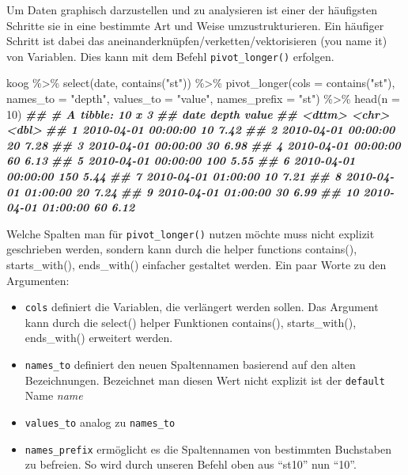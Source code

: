 \documentclass[
]{article}
\newenvironment{Shaded}{\begin{snugshade}}{\end{snugshade}}
\newcommand{\AttributeTok}[1]{\textcolor[rgb]{0.77,0.63,0.00}{#1}}
\newcommand{\DecValTok}[1]{\textcolor[rgb]{0.00,0.00,0.81}{#1}}
\newcommand{\DocumentationTok}[1]{\textcolor[rgb]{0.56,0.35,0.01}{\textbf{\textit{#1}}}}
\newcommand{\FunctionTok}[1]{\textcolor[rgb]{0.00,0.00,0.00}{#1}}
\newcommand{\NormalTok}[1]{#1}
\newcommand{\SpecialCharTok}[1]{\textcolor[rgb]{0.00,0.00,0.00}{#1}}
\newcommand{\StringTok}[1]{\textcolor[rgb]{0.31,0.60,0.02}{#1}}
\providecommand{\tightlist}{%
  \setlength{\itemsep}{0pt}\setlength{\parskip}{0pt}}
\begin{document}
Um Daten graphisch darzustellen und zu analysieren ist einer der häufigsten Schritte sie in eine bestimmte Art und Weise umzustrukturieren. Ein häufiger Schritt ist dabei das aneinanderknüpfen/verketten/vektorisieren (you name it) von Variablen. Dies kann mit dem Befehl \texttt{pivot\_longer()} erfolgen.

\begin{Shaded}
\begin{Highlighting}[]
\NormalTok{koog }\SpecialCharTok{\%\textgreater{}\%}
  \FunctionTok{select}\NormalTok{(date, }\FunctionTok{contains}\NormalTok{(}\StringTok{"st"}\NormalTok{)) }\SpecialCharTok{\%\textgreater{}\%}
  \FunctionTok{pivot\_longer}\NormalTok{(}\AttributeTok{cols =} \FunctionTok{contains}\NormalTok{(}\StringTok{"st"}\NormalTok{), }\AttributeTok{names\_to =} \StringTok{"depth"}\NormalTok{, }\AttributeTok{values\_to =} \StringTok{"value"}\NormalTok{, }\AttributeTok{names\_prefix =} \StringTok{"st"}\NormalTok{) }\SpecialCharTok{\%\textgreater{}\%}
  \FunctionTok{head}\NormalTok{(}\AttributeTok{n =} \DecValTok{10}\NormalTok{)}
\DocumentationTok{\#\# \# A tibble: 10 x 3}
\DocumentationTok{\#\#    date                depth value}
\DocumentationTok{\#\#    \textless{}dttm\textgreater{}              \textless{}chr\textgreater{} \textless{}dbl\textgreater{}}
\DocumentationTok{\#\#  1 2010{-}04{-}01 00:00:00 10     7.42}
\DocumentationTok{\#\#  2 2010{-}04{-}01 00:00:00 20     7.28}
\DocumentationTok{\#\#  3 2010{-}04{-}01 00:00:00 30     6.98}
\DocumentationTok{\#\#  4 2010{-}04{-}01 00:00:00 60     6.13}
\DocumentationTok{\#\#  5 2010{-}04{-}01 00:00:00 100    5.55}
\DocumentationTok{\#\#  6 2010{-}04{-}01 00:00:00 150    5.44}
\DocumentationTok{\#\#  7 2010{-}04{-}01 01:00:00 10     7.21}
\DocumentationTok{\#\#  8 2010{-}04{-}01 01:00:00 20     7.24}
\DocumentationTok{\#\#  9 2010{-}04{-}01 01:00:00 30     6.99}
\DocumentationTok{\#\# 10 2010{-}04{-}01 01:00:00 60     6.12}
\end{Highlighting}
\end{Shaded}

Welche Spalten man für \texttt{pivot\_longer()} nutzen möchte muss nicht explizit geschrieben werden, sondern kann durch die helper functions contains(), starts\_with(), ends\_with() einfacher gestaltet werden. Ein paar Worte zu den Argumenten:

\begin{itemize}
\tightlist
\item
  \texttt{cols} definiert die Variablen, die verlängert werden sollen. Das Argument kann durch die select() helper Funktionen contains(), starts\_with(), ends\_with() erweitert werden.
\item
  \texttt{names\_to} definiert den neuen Spaltennamen basierend auf den alten Bezeichnungen. Bezeichnet man diesen Wert nicht explizit ist der \texttt{default} Name \emph{name}
\item
  \texttt{values\_to} analog zu \texttt{names\_to}
\item
  \texttt{names\_prefix} ermöglicht es die Spaltennamen von bestimmten Buchstaben zu befreien. So wird durch unseren Befehl oben aus ``st10'' nun ``10''.
\end{itemize}
\end{document}
